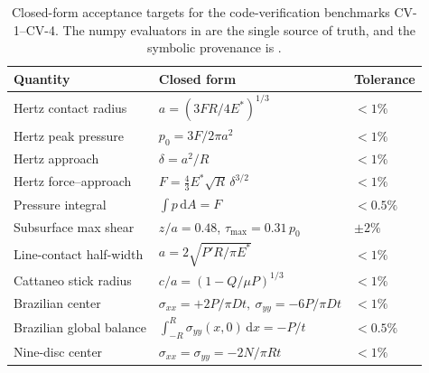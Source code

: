 \begin{table}
\centering
\caption{Closed-form acceptance targets for the code-verification benchmarks CV-1--CV-4.
The numpy evaluators in  are the single source of
truth, and the symbolic provenance is .}
\label{tab:closedforms}
\begin{tabular}{@{}lll@{}}
\toprule
Quantity & Closed form & Tolerance \\
\midrule
Hertz contact radius      & $a=(3FR/4E^\ast)^{1/3}$                 & $<1\%$ \\
Hertz peak pressure       & $p_0=3F/2\pi a^2$                       & $<1\%$ \\
Hertz approach            & $\delta=a^2/R$                          & $<1\%$ \\
Hertz force--approach     & $F=\tfrac43 E^\ast\sqrt{R}\,\delta^{3/2}$ & $<1\%$ \\
Pressure integral         & $\int p\,\mathrm{d}A=F$                 & $<0.5\%$ \\
Subsurface max shear      & $z/a=0.48$, $\tau_{\max}=0.31\,p_0$     & $\pm2\%$ \\
Line-contact half-width   & $a=2\sqrt{P'R/\pi E^\ast}$              & $<1\%$ \\
Cattaneo stick radius     & $c/a=(1-Q/\mu P)^{1/3}$                 & $<1\%$ \\
Brazilian center          & $\sigma_{xx}=+2P/\pi Dt,\ \sigma_{yy}=-6P/\pi Dt$ & $<1\%$ \\
Brazilian global balance  & $\int_{-R}^{R}\sigma_{yy}(x,0)\,\mathrm{d}x=-P/t$ & $<0.5\%$ \\
Nine-disc center          & $\sigma_{xx}=\sigma_{yy}=-2N/\pi Rt$    & $<1\%$ \\
\bottomrule
\end{tabular}
\end{table}
